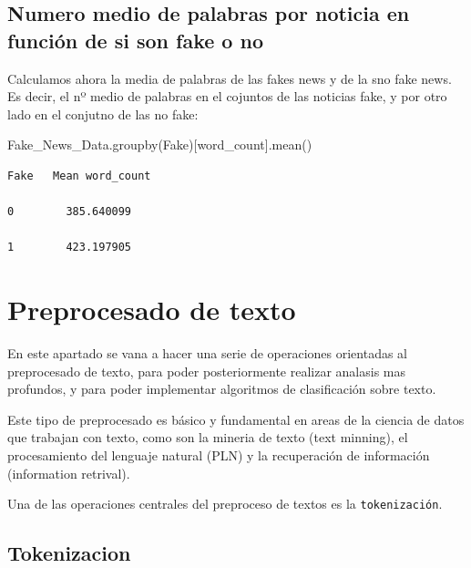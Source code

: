 \documentclass[
  11pt,
  a4paper,
]{article}
\newenvironment{Shaded}{\begin{snugshade}}{\end{snugshade}}
\newcommand{\NormalTok}[1]{#1}
\newcommand{\StringTok}[1]{\textcolor[rgb]{0.31,0.60,0.02}{#1}}
\begin{document}
\hypertarget{numero-medio-de-palabras-por-noticia-en-funciuxf3n-de-si-son-fake-o-no}{%
\subsection{Numero medio de palabras por noticia en función de si son
fake o
no}\label{numero-medio-de-palabras-por-noticia-en-funciuxf3n-de-si-son-fake-o-no}}

Calculamos ahora la media de palabras de las fakes news y de la sno fake
news. Es decir, el nº medio de palabras en el cojuntos de las noticias
fake, y por otro lado en el conjutno de las no fake:

\begin{Shaded}
\begin{Highlighting}[]
\NormalTok{Fake\_News\_Data.groupby(}\StringTok{\textquotesingle{}Fake\textquotesingle{}}\NormalTok{)[}\StringTok{\textquotesingle{}word\_count\textquotesingle{}}\NormalTok{].mean()}
\end{Highlighting}
\end{Shaded}

\begin{verbatim}
Fake   Mean word_count

0        385.640099

1        423.197905
\end{verbatim}

\hypertarget{preprocesado-de-texto}{%
\section{Preprocesado de texto}\label{preprocesado-de-texto}}

En este apartado se vana a hacer una serie de operaciones orientadas al
preprocesado de texto, para poder posteriormente realizar analasis mas
profundos, y para poder implementar algoritmos de clasificación sobre
texto.

Este tipo de preprocesado es básico y fundamental en areas de la ciencia
de datos que trabajan con texto, como son la mineria de texto (text
minning), el procesamiento del lenguaje natural (PLN) y la recuperación
de información (information retrival).

Una de las operaciones centrales del preproceso de textos es la
\texttt{tokenización}.

\hypertarget{tokenizacion}{%
\subsection{Tokenizacion}\label{tokenizacion}}
\end{document}

